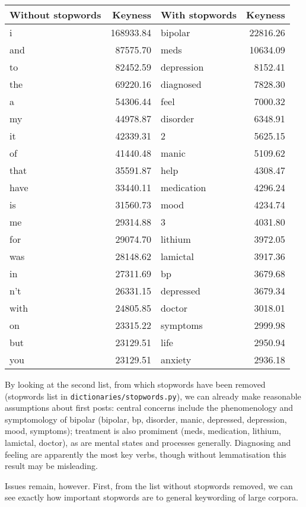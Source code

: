\begin{tabular}{lr|lr}
\toprule
Without stopwords &  Keyness & With stopwords &   Keyness \\
\midrule
i    & 168933.84 & bipolar    & 22816.26 \\
and  &  87575.70 & meds       & 10634.09 \\
to   &  82452.59 & depression &  8152.41 \\
the  &  69220.16 & diagnosed  &  7828.30 \\
a    &  54306.44 & feel       &  7000.32 \\
my   &  44978.87 & disorder   &  6348.91 \\
it   &  42339.31 & 2          &  5625.15 \\
of   &  41440.48 & manic      &  5109.62 \\
that &  35591.87 & help       &  4308.47 \\
have &  33440.11 & medication &  4296.24 \\
is   &  31560.73 & mood       &  4234.74 \\
me   &  29314.88 & 3          &  4031.80 \\
for  &  29074.70 & lithium    &  3972.05 \\
was  &  28148.62 & lamictal   &  3917.36 \\
in   &  27311.69 & bp         &  3679.68 \\
n't  &  26331.15 & depressed  &  3679.34 \\
with &  24805.85 & doctor     &  3018.01 \\
on   &  23315.22 & symptoms   &  2999.98 \\
but  &  23129.51 & life       &  2950.94 \\
you  &  23129.51 & anxiety    &  2936.18 \\
\bottomrule
\end{tabular}

By looking at the second list, from which stopwords have been removed (stopwords list in \texttt{dictionaries/stopwords.py}), we can already make reasonable assumptions about first posts: central concerns include the phenomenology and symptomology of bipolar (bipolar, bp, disorder, manic, depressed, depression, mood, symptoms); treatment is also promiment (meds, medication, lithium, lamictal, doctor), as are mental states and processes generally. Diagnosing and feeling are apparently the most key verbs, though without lemmatisation this result may be misleading.

Issues remain, however. First, from the list without stopwords removed, we can see exactly how important stopwords are to general keywording of large corpora.

